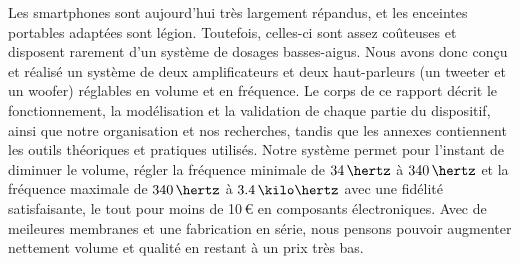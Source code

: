{
%
%
    Les smartphones sont aujourd'hui très largement répandus,
    et les enceintes portables adaptées sont légion.
    Toutefois, celles-ci sont assez coûteuses et disposent rarement
    d'un système de dosages basses-aigus.
    Nous avons donc conçu et réalisé un système de deux amplificateurs
    et deux haut-parleurs (un tweeter et un woofer)
    réglables en volume et en fréquence.
    Le corps de ce rapport décrit le fonctionnement, la modélisation
    et la validation de chaque partie du dispositif,
    ainsi que notre organisation et nos recherches, tandis que
    les annexes contiennent les outils théoriques et pratiques utilisés.
    Notre système permet pour l'instant de diminuer le volume,
    régler
    la fréquence minimale de $34\,\hertz$ à $340\,\hertz$
    et la fréquence maximale de $340\,\hertz$ à $3.4\,\kilo\hertz$
    avec une fidélité satisfaisante, le tout pour moins de 10\,\euro{}
    en composants électroniques.
    Avec de meileures membranes et une fabrication en série,
    nous pensons pouvoir augmenter nettement volume et qualité
    en restant à un prix très bas.
}

